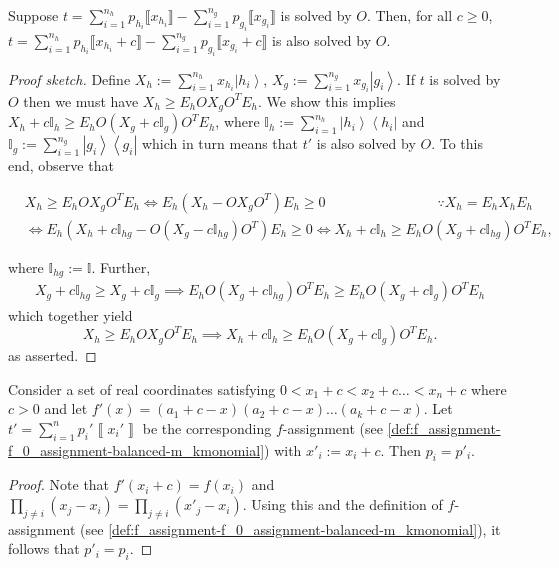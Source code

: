 \documentclass{article}
\newcommand{\atul}[1]{#1} %
\begin{document}
\begin{lemma}\label{lem:validAfterTranslating}
  \atul{Suppose $t=\sum_{i=1}^{n_{h}}p_{h_{i}} \llbracket x_{h_{i}} \rrbracket - \sum_{i=1}^{n_g}p_{g_{i}} \llbracket x_{g_{i}} \rrbracket$ is solved by $O$. Then, for all $c \ge 0$, $t=\sum_{i=1}^{n_{h}}p_{h_{i}} \llbracket x_{h_{i}} + c \rrbracket - \sum_{i=1}^{n_g}p_{g_{i}} \llbracket x_{g_{i}} + c \rrbracket$ is also solved by $O$.}
\end{lemma}
\atul{
  \begin{proof}[Proof sketch]
    Define $X_{h}:=\sum_{i=1}^{n_{h}}x_{h_{i}}\left|h_{i}\right\rangle $,
    $X_{g}:=\sum_{i=1}^{n_{g}}x_{g_{i}}\left|g_{i}\right\rangle $. If
    $t$ is solved by $O$ then we must have $X_{h}\ge E_{h}OX_{g}O^{T}E_{h}$.
    We show this implies $X_{h}+c\mathbb{I}_{h}\ge E_{h}O(X_{g}+c\mathbb{I}_{g})O^{T}E_{h}$,
    where $\mathbb{I}_{h}:=\sum_{i=1}^{n_{h}}\left|h_{i}\right\rangle \left\langle h_{i}\right|$
    and $\mathbb{I}_{g}:=\sum_{i=1}^{n_{g}}\left|g_{i}\right\rangle \left\langle g_{i}\right|$ which in turn means that $t'$ is also solved by $O$. %
    To this end, observe that
    \begin{small}
      \begin{align*}
         & X_{h}  \ge E_{h}OX_{g}O^{T}E_{h} \iff E_{h}(X_{h}-OX_{g}O^{T})E_{h}  \ge0 \qquad\qquad\qquad\qquad \because X_{h}=E_{h}X_{h}E_{h} \\
         & \iff E_{h}(X_{h}+c\mathbb{I}_{hg}-O(X_{g}-c\mathbb{I}_{hg})O^{T})E_{h}  \ge0
        \iff X_{h}+c\mathbb{I}_{h}  \ge E_{h}O(X_{g}+c\mathbb{I}_{hg})O^{T}E_{h},
      \end{align*}
    \end{small}
    where $\mathbb{I}_{hg}:=\mathbb{I}$. Further,
    \begin{align*}
      X_{g}+c\mathbb{I}_{hg}  \ge X_{g}+c\mathbb{I}_{g}
      \implies E_{h}O(X_{g}+c\mathbb{I}_{hg})O^{T}E_{h}  \ge E_{h}O(X_{g}+c\mathbb{I}_{g})O^{T}E_{h}
    \end{align*}
    which together yield
    \begin{displaymath}
      X_{h}\ge E_{h}OX_{g}O^{T}E_{h} \implies X_{h}+c\mathbb{I}_{h}\ge E_{h}O(X_{g}+c\mathbb{I}_{g})O^{T}E_{h}.
    \end{displaymath}
    as asserted.
  \end{proof}
}

\begin{lemma}\label{lem:fAssignmentTranslation}
  \atul{Consider a set of real
  coordinates satisfying $0<x_{1}+c<x_{2}+c\dots<x_{n}+c$ where $c>0$
  and let $f'(x)=(a_{1}+c-x)(a_{2}+c-x)\dots(a_{k}+c-x)$. Let $t'=\sum_{i=1}^{n}p_{i}'\left\llbracket x_{i}'\right\rrbracket $
  be the corresponding $f$-assignment (see \cref{def:f_assignment-f_0_assignment-balanced-m_kmonomial}) with $x'_{i}:=x_{i}+c$.
  Then $p_{i}=p'_{i}$.} %
\end{lemma}
\atul{
  \begin{proof}
    Note that $f'(x_i+c)=f(x_i)$ and $\prod_{j\neq i} (x_j -x_i) = \prod_{j\neq i} (x'_j -x_i)$. Using this and the definition of $f$-assignment (see \cref{def:f_assignment-f_0_assignment-balanced-m_kmonomial}), it follows that $p'_i=p_i$.
  \end{proof}
}
\end{document}
